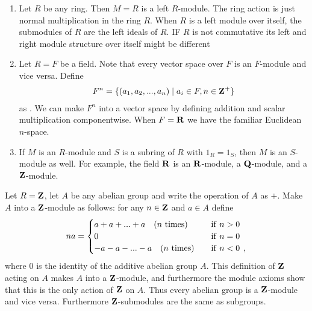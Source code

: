     \begin{example}
        \phantom{a}
        \begin{enumerate}[label = (\arabic*)]
            \item Let $R$ be any ring. Then $M = R$ is a left $R$-module. The ring action is just normal multiplication in the ring $R$. When $R$ is a left module over itself, the submodules of $R$ are the left ideals of $R$. IF $R$ is not commutative its left and right module structure over itself might be different
            \item Let $R = F$ be a field. Note that every vector space over $F$ is an $F$-module and vice versa. Define
                \begin{equation*}
                \begin{split}
                F^n = \{(a_1,a_2,...,a_n) \mid a_i \in F, n \in \mathbf{Z}^{+}\}
                \end{split}
                \end{equation*}
            as . We can make $F^n$ into a vector space by defining addition and scalar multiplication componentwise. When $F = \mathbf{R}$ we have the familiar Euclidean $n$-space.
            \item If $M$ is an $R$-module and $S$ is a subring of $R$ with $1_R = 1_S$, then $M$ is an $S$-module as well. For example, the field $\mathbf{R}$ is an $\mathbf{R}$-module, a $\mathbf{Q}$-module, and a $\mathbf{Z}$-module.
        \end{enumerate}
    \end{example}

    \begin{example}
        Let $R = \mathbf{Z}$, let $A$ be any abelian group and write the operation of $A$ as $+$. Make $A$ into a $\mathbf{Z}$-module as follows: for any $n \in \mathbf{Z}$ and $a \in A$ define
        \begin{equation*}
        na = 
        \begin{cases} 
        a + a + ... + a \text{\quad ($n$ times)} & \quad \text{if}\hskip0.4em\relax n>0 \\
        0 & \quad \text{if}\hskip0.4em\relax n=0 \\
        -a - a - ... - a \text{\quad ($n$ times)} & \quad \text{if}\hskip0.4em\relax n<0\hskip0.4em\relax, 
        \end{cases}
        \end{equation*}
        where $0$ is the identity of the additive abelian group $A$. This definition of $\mathbf{Z}$ acting on $A$ makes $A$ into a $\mathbf{Z}$-module, and furthermore the module axioms show that this is the only action of $\mathbf{Z}$ on $A$. Thus every abelian group is a $\mathbf{Z}$-module and vice versa. Furthermore $\mathbf{Z}$-submodules are the same as subgroups.
    \end{example}

